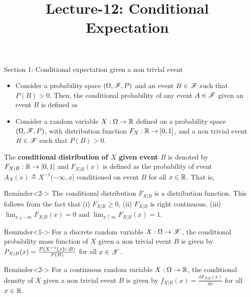 \documentclass[12pt,aspectratio=169]{beamer}
\title{Lecture-12: Conditional Expectation}
\date{}
\begin{document}
\pagestyle{empty}
\maketitle

\begin{frame}{Section 1: Conditional expectation given a non trivial event}
\begin{itemize}
\item <1-> Consider a probability space $(\Omega, \mathscr{F}, P)$ and an event $B \in \mathscr{F}$ such that $P(B) > 0$. 
Then, the conditional probability of any event $A \in \mathscr{F}$ given an event $B$ is defined as
\item <2-> Consider a random variable $X: \Omega\to\mathbb{R}$ defined on a probability space $(\Omega, \mathscr{F}, P)$, 
with distribution function $F_X: \mathbb{R} \to [0,1]$, 
and a non trivial event $B \in \mathscr{F}$ such that $P(B) > 0$. 
\end{itemize}
\end{frame}

\begin{frame}
\begin{Definition}%
The \textbf{conditional distribution of $X$ given event $B$} is denoted by $F_{X| B}: \mathbb{R} \to [0,1]$ 
and $F_{X| B}(x)$ is defined as the probability of event $A_X(x) \triangleq X^{-1}(-\infty, x]$ conditioned on event $B$ for all $x\in\mathbb{R}$. 
That is, 
\end{Definition}
\begin{block}{Reminder}<2->
The conditional distribution $F_{X|B}$ is a distribution function. 
This follows from the fact that 
(i) $F_{X|B} \ge 0$,
(ii) $F_{X|B}$ is right continuous,  
(iii) $\lim_{x\downarrow -\infty}F_{X|B}(x) = 0$ and $\lim_{x\uparrow \infty}F_{X|B}(x) = 1$.
\end{block}
\end{frame}

\begin{frame}
\begin{block}{Reminder}<1->
For a discrete random variable $X:\Omega\to\mathscr{X}$, the conditional probability mass function of $X$ given a non trivial event $B$ is given by $P_{X|B}(x) = \frac{P(X^{-1}\left\{x\right\}\cap B)}{P(B)}$ for all $x \in \mathscr{X}$. 
\end{block}
\begin{block}{Reminder}<2->
For a continuous random variable $X:\Omega\to\mathbb{R}$, the conditional density of $X$ given a non trivial event $B$ is given by $f_{X|B}(x) = \frac{dF_{X|B}(x)}{dx}$ for all $x \in \mathbb{R}$. 
\end{block}
\end{frame}
\end{document}
